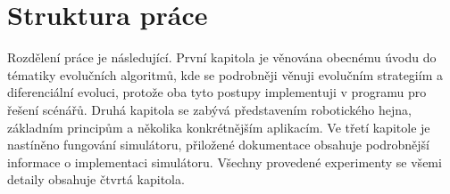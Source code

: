 \section*{Struktura práce}
Rozdělení práce je následující. První kapitola je věnována obecnému úvodu do tématiky evolučních algoritmů, kde se podrobněji věnuji evolučním strategiím a diferenciální evoluci, protože oba tyto postupy implementuji v programu pro řešení scénářů. Druhá kapitola se zabývá představením robotického hejna, základním principům a několika konkrétnějším aplikacím. Ve třetí kapitole je nastíněno fungování simulátoru, přiložené dokumentace obsahuje podrobnější informace o implementaci simulátoru. Všechny provedené experimenty se všemi detaily obsahuje čtvrtá kapitola.